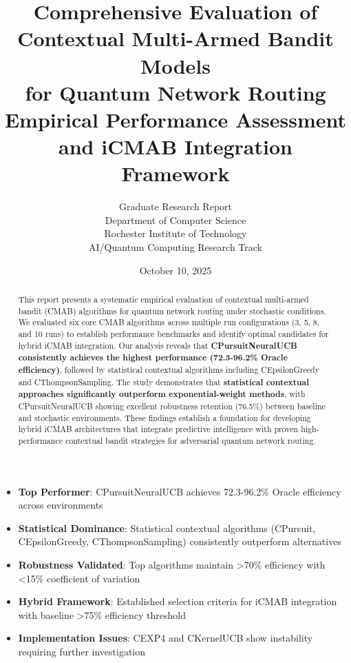 \documentclass[12pt,a4paper]{article}
\title{\textbf{Comprehensive Evaluation of Contextual Multi-Armed Bandit Models\\for Quantum Network Routing}\\
\large{Empirical Performance Assessment and iCMAB Integration Framework}}
\author{Graduate Research Report\\
Department of Computer Science\\
Rochester Institute of Technology\\
AI/Quantum Computing Research Track}
\date{October 10, 2025}
\newcommand{\primarytext}[1]{\textcolor{primaryblue}{\textbf{#1}}}
\newcommand{\secondarytext}[1]{\textcolor{secondaryblue}{\textbf{#1}}}
\newcommand{\success}[1]{\textcolor{accentgreen}{\textbf{#1}}}
\newcommand{\warning}[1]{\textcolor{warningred}{\textbf{#1}}}
\begin{document}
\maketitle

\begin{abstract}
This report presents a systematic empirical evaluation of contextual multi-armed bandit (CMAB) algorithms for quantum network routing under stochastic conditions. We evaluated six core CMAB algorithms across multiple run configurations (3, 5, 8, and 10 runs) to establish performance benchmarks and identify optimal candidates for hybrid iCMAB integration. Our analysis reveals that \primarytext{CPursuitNeuralUCB consistently achieves the highest performance (72.3-96.2\% Oracle efficiency)}, followed by statistical contextual algorithms including CEpsilonGreedy and CThompsonSampling. The study demonstrates that \success{statistical contextual approaches significantly outperform exponential-weight methods}, with CPursuitNeuralUCB showing excellent robustness retention (76.5\%) between baseline and stochastic environments. These findings establish a foundation for developing hybrid iCMAB architectures that integrate predictive intelligence with proven high-performance contextual bandit strategies for adversarial quantum network routing.
\end{abstract}

\vspace{0.5cm}
\tableofcontents

\newpage

\begin{tcolorbox}[colback=highlightgray,colframe=primaryblue,title=\textbf{Executive Summary - Key Findings}]
\begin{itemize}
\item \primarytext{Top Performer}: CPursuitNeuralUCB achieves 72.3-96.2\% Oracle efficiency across environments
\item \secondarytext{Statistical Dominance}: Statistical contextual algorithms (CPursuit, CEpsilonGreedy, CThompsonSampling) consistently outperform alternatives
\item \success{Robustness Validated}: Top algorithms maintain >70\% efficiency with <15\% coefficient of variation
\item \primarytext{Hybrid Framework}: Established selection criteria for iCMAB integration with baseline >75\% efficiency threshold
\item \warning{Implementation Issues}: CEXP4 and CKernelUCB show instability requiring further investigation
\end{itemize}
\end{tcolorbox}
\end{document}
